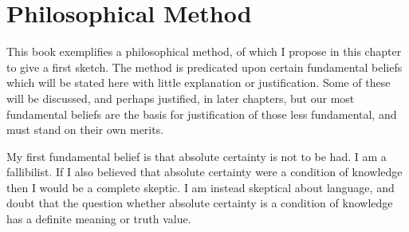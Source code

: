 \chapter{Philosophical Method}\label{Philosophy}

This book exemplifies a philosophical method, of which I propose in this chapter to give a first sketch.
The method is predicated upon certain fundamental beliefs which will be stated here with little explanation or justification.
Some of these will be discussed, and perhaps justified, in later chapters, but our most fundamental beliefs are the basis for justification of those less fundamental, and must stand on their own merits.

My first fundamental belief is that absolute certainty is not to be had.
I am a fallibilist.
If I also believed that absolute certainty were a condition of knowledge then I would be a complete skeptic.
I am instead skeptical about language, and doubt that the question whether absolute certainty is a condition of knowledge has a definite meaning or truth value.








